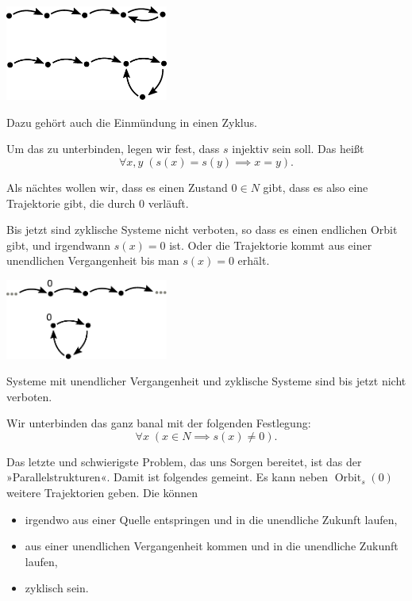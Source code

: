 \documentclass[9pt]{beamer}
\newcommand{\imgcaption}[1]{{\small #1}}
\begin{document}
\begin{frame}
\begin{center}
\includegraphics[width=0.4\textwidth]{img/Zyklische-Zukunft.pdf}
\end{center}
\imgcaption{Dazu gehört auch die Einmündung in einen Zyklus.}
\end{frame}

\begin{frame}
Um das zu unterbinden, legen wir fest, dass $s$ injektiv sein soll.
Das heißt
\[\forall x,y\; (s(x)=s(y)\implies x=y).\]
\end{frame}

\begin{frame}
Als nächtes wollen wir, dass es einen Zustand $0\in N$ gibt, dass es
also eine Trajektorie gibt, die durch $0$ verläuft.
\end{frame}

\begin{frame}
Bis jetzt sind zyklische Systeme nicht verboten, so dass es einen
endlichen Orbit gibt, und irgendwann $s(x)=0$ ist. Oder die Trajektorie
kommt aus einer unendlichen Vergangenheit bis man $s(x)=0$ erhält.
\end{frame}

\begin{frame}
\begin{center}
\includegraphics[width=0.4\textwidth]{img/Zyklisches-System.pdf}
\end{center}
\imgcaption{Systeme mit unendlicher Vergangenheit und
zyklische Systeme sind bis jetzt nicht verboten.}
\end{frame}

\begin{frame}
Wir unterbinden das ganz banal mit der folgenden Festlegung:
\[\forall x\;(x\in N\implies s(x)\ne 0).\]
\end{frame}

\begin{frame}
Das letzte und schwierigste Problem, das uns Sorgen bereitet, ist
das der »Parallelstrukturen«. Damit ist folgendes gemeint.
Es kann neben $\operatorname{Orbit}_s(0)$
weitere Trajektorien geben. Die können
\begin{itemize}
\item irgendwo aus einer Quelle entspringen und in die unendliche Zukunft laufen,
\item aus einer unendlichen Vergangenheit kommen und in die unendliche Zukunft laufen,
\item zyklisch sein.
\end{itemize}
\end{frame}
\end{document}
